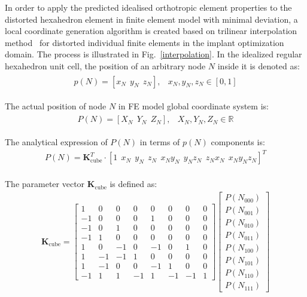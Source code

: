 \documentclass[12pt]{extbook}
\begin{document}
In order to apply the predicted idealised orthotropic element properties to the distorted hexahedron element in finite element model with minimal deviation, a local coordinate generation algorithm is created based on trilinear interpolation method~\cite{kang2006three} for distorted individual finite elements in the implant optimization domain. The process is illustrated in Fig.~\ref{interpolation}. In the idealized regular hexahedron unit cell, the position of an arbitrary node $N$ inside it is denoted as:
\begin{equation}
\begin{split}
\begin{array}{ll}
p(N) = [x_N~~ y_N ~~ z_N], & x_N, y_N, z_N \in [0,1]
\end{array}
\end{split}
\label{3-1-1}
\end{equation}

The actual position of node $N$ in FE model global coordinate system is:
\begin{equation}
\begin{split}
\begin{array}{ll}
P(N) = [X_{N} ~~ Y_{N} ~~ Z_{N}], & X_{N}, Y_{N}, Z_{N} \in \mathbb{R}
\end{array}
\end{split}
\label{3-1-2}
\end{equation}

The analytical expression of $P(N)$ in terms of $p(N)$ components is:
\begin{equation}
\begin{split}
P(N) = \bm{K}^T_{\text{cube}} \cdot [1 ~~ x_N ~~ y_N ~~ z_N ~~ x_N y_N ~~ y_N z_N ~~ z_N x_N ~~ x_N y_N z_N]^T\\
\end{split}
\label{3-1-3}
\end{equation}

The parameter vector $\bm{K}_{\text{cube}}$ is defined as:
\begin{equation}
\begin{split}
\bm{K}_{\text{cube}} =
\left [ \begin{array}{rrrrrrrr}
1&0&0&0&0&0&0&0\\
-1&0&0&0&1&0&0&0\\
-1&0&1&0&0&0&0&0\\
-1&1&0&0&0&0&0&0\\
1&0&-1&0&-1&0&1&0\\
1&-1&-1&1&0&0&0&0\\
1&-1&0&0&-1&1&0&0\\
-1&1&1&-1&1&-1&-1&1
\end{array}\right ]
\left [ \begin{array}{c}
P(N_{000})\\
P(N_{001})\\
P(N_{010})\\
P(N_{011})\\
P(N_{100})\\
P(N_{101})\\
P(N_{110})\\
P(N_{111})
\end{array}\right ]
\end{split}
\label{3-1-4}
\end{equation}
\end{document}
